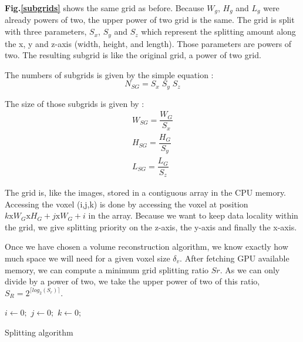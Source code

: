 \documentclass[12pt,journal,compsoc]{IEEEtran}
\begin{document}
\textbf{Fig.\ref{subgrids}} shows the same grid as before. Because $W_g$, $H_g$ and $L_g$ were already powers of two, the upper power of two grid is the same. The grid is split with three parameters, $S_x$, $S_y$ and $S_z$ which represent the splitting amount along the x, y and z-axis (width, height, and length). Those parameters are powers of two. The resulting subgrid is like the original grid, a power of two grid. 
\begin{samepage}
The numbers of subgrids is given by the simple equation :
\begin{equation}
	N_{SG} = S_x\;S_y\;S_z
\end{equation}
\end{samepage}

\begin{samepage}
The size of those subgrids is given by :
\begin{eqnarray}
	W_{SG} = \dfrac{W_G}{S_x}\\
	H_{SG} = \dfrac{H_G}{S_y}\\
	L_{SG} = \dfrac{L_G}{S_z}
\end{eqnarray}
\end{samepage}

The grid is, like the images, stored in a contiguous array in the CPU memory. Accessing the voxel (i,j,k) is done by accessing the voxel at position $k\text{x}W_G\text{x}H_G + j\text{x}W_G + i$ in the array.
Because we want to keep data locality within the grid, we give splitting priority on the z-axis, the y-axis and finally the x-axis.

Once we have chosen a volume reconstruction algorithm, we know exactly how much space we will need for a given voxel size $\delta_v$. After fetching GPU available memory, we can compute a minimum grid splitting ratio $Sr$. As we can only divide by a power of two, we take the upper power of two of this ratio,  $S_R = 2^{\lceil log_2(S_r) \rceil}$.

\begin{samepage}
\begin{algorithm}
\vspace{0.5cm} $i\gets0;$ $j\gets0;$ $k\gets0;$\\
\caption{Splitting algorithm}
\label{split_algorithm}
\end{algorithm}
\end{samepage}
\end{document}
